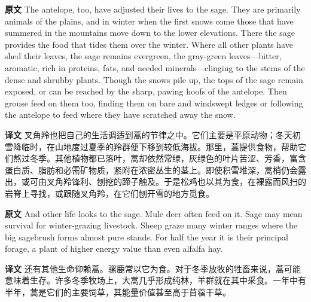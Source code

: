 \documentclass[UTF8,zihao=-4]{ctexart}
\begin{document}
\noindent\textbf{原文} The antelope, too, have adjusted their lives to the sage. They are primarily animals of the plains, and in winter when the first snows come those that have summered in the mountains move down to the lower elevations. There the sage provides the food that tides them over the winter. Where all other plants have shed their leaves, the sage remains evergreen, the gray-green leaves---bitter, aromatic, rich in proteins, fats, and needed minerals---clinging to the stems of the dense and shrubby plants. Though the snows pile up, the tops of the sage remain exposed, or can be reached by the sharp, pawing hoofs of the antelope. Then grouse feed on them too, finding them on bare and windswept ledges or following the antelope to feed where they have scratched away the snow.
\par
\noindent\textbf{译文} 叉角羚也把自己的生活调适到蒿的节律之中。它们主要是平原动物；冬天初雪降临时，在山地度过夏季的羚群便下移到较低海拔。那里，蒿提供食物，帮助它们熬过冬季。其他植物都已落叶，蒿却依然常绿，灰绿色的叶片苦涩、芳香，富含蛋白质、脂肪和必需矿物质，紧附在浓密丛生的茎上。即使积雪堆深，蒿梢仍会露出，或可由叉角羚锋利、刨挖的蹄子触及。于是松鸡也以其为食，在裸露而风扫的岩脊上寻找，或跟随叉角羚，在它们刨开雪的地方觅食。
\par\medskip

\noindent\textbf{原文} And other life looks to the sage. Mule deer often feed on it. Sage may mean survival for winter-grazing livestock. Sheep graze many winter ranges where the big sagebrush forms almost pure stands. For half the year it is their principal forage, a plant of higher energy value than even alfalfa hay.
\par
\noindent\textbf{译文} 还有其他生命仰赖蒿。骡鹿常以它为食。对于冬季放牧的牲畜来说，蒿可能意味着生存。许多冬季牧场上，大蒿几乎形成纯林，羊群就在其中采食。一年中有半年，蒿是它们的主要饲草，其能量价值甚至高于苜蓿干草。
\par\medskip
\end{document}

